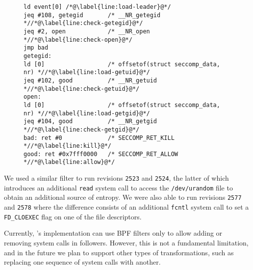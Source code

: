 

\begin{figure}[t]
\begin{lstlisting}[label={lst:lighttpd},language={[bpf]Assembler},caption={Example of a BPF rewriting rule.}]
ld event[0] /*@\label{line:load-leader}@*/
jeq #108, getegid       /* __NR_getegid *//*@\label{line:check-getegid}@*/
jeq #2, open            /* __NR_open *//*@\label{line:check-open}@*/
jmp bad
getegid:
ld [0]                  /* offsetof(struct seccomp_data, nr) *//*@\label{line:load-getuid}@*/
jeq #102, good          /* __NR_getuid *//*@\label{line:check-getuid}@*/
open:
ld [0]                  /* offsetof(struct seccomp_data, nr) *//*@\label{line:load-getgid}@*/
jeq #104, good          /* __NR_getgid *//*@\label{line:check-getgid}@*/
bad: ret #0             /* SECCOMP_RET_KILL *//*@\label{line:kill}@*/
good: ret #0x7fff0000   /* SECCOMP_RET_ALLOW *//*@\label{line:allow}@*/
\end{lstlisting}
\end{figure}



We used a similar filter to run revisions \lstinline`2523` and
\lstinline`2524`, the latter of which introduces an additional
\lstinline`read` system call to access the \lstinline`/dev/urandom`
file to obtain an additional source of entropy.  We were also able to
run revisions \lstinline`2577` and \lstinline`2578` where the
difference consists of an additional \lstinline`fcntl` system call to
set a \lstinline`FD_CLOEXEC` flag on one of the file descriptors.

Currently, \varan's implementation can use BPF filters only to allow adding
or removing system calls in followers.  However, this is not a
fundamental limitation, and in the future we plan
to support  other types of transformations, such as replacing one
sequence of system calls with another.




